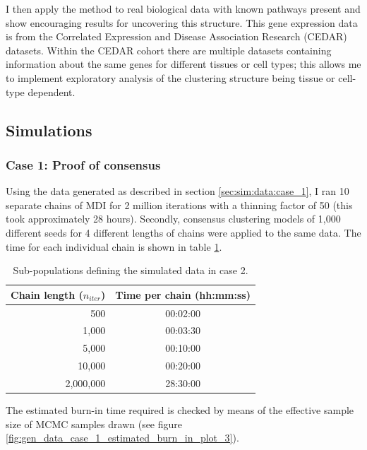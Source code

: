 \documentclass[12pt]{article} %
\begin{document}
	I then apply the method to real biological data with known pathways present and show encouraging results for uncovering this structure. This gene expression data is from the Correlated Expression and Disease Association Research (CEDAR) datasets. Within the CEDAR cohort there are multiple datasets containing information about the same genes for different tissues or cell types; this allows me to implement exploratory analysis of the clustering structure being tissue or cell-type dependent.
	
	\subsection{Simulations}
	\subsubsection{Case 1: Proof of consensus} \label{sec:results:case_1}
	Using the data generated as described in section \ref{sec:sim:data:case_1}, I ran 10 separate chains of MDI for 2 million iterations with a thinning factor of 50 (this took approximately 28 hours). Secondly, consensus clustering models of 1,000 different seeds for 4 different lengths of chains were applied to the same data. The time for each individual chain is shown in table \ref{table:results:sim_1:timing}.
	
	\begin{table}[!htb] 
		\centering
		\begin{tabular}{r|c} 
			Chain length ($n_{iter}$)	& Time per chain (hh:mm:ss)\\ 
			\hline
			500							& 00:02:00 \\
			1,000						& 00:03:30 \\
			5,000						& 00:10:00 \\
			10,000						& 00:20:00 \\
			2,000,000					& 28:30:00
		\end{tabular}
		\caption{Sub-populations defining the simulated data in case 2.}
		\label{table:results:sim_1:timing}
	\end{table}

	The estimated burn-in time required is checked by means of the effective sample size of MCMC samples drawn (see figure \ref{fig:gen_data_case_1_estimated_burn_in_plot_3}).
	
\end{document}
